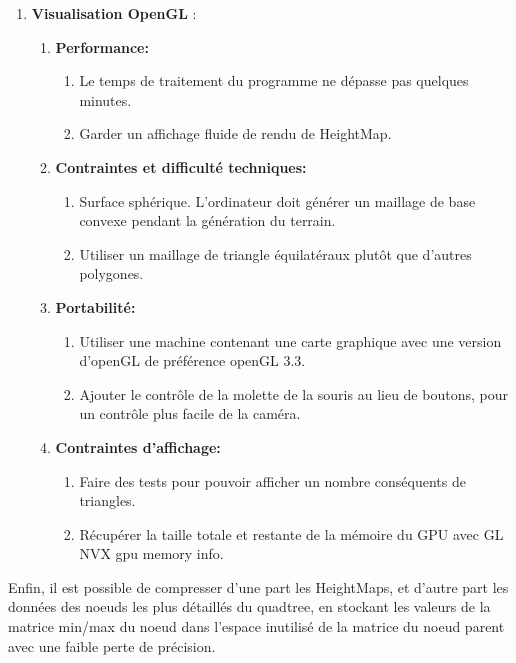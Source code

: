 \documentclass[12pt]{report}
\begin{document}
\begin{enumerate}
\begin{enumerate}
    \end{enumerate}
    \item \textbf{Visualisation OpenGL} :
    \begin{enumerate}
        \item \textbf{Performance:}
        \begin{enumerate}
            \item Le temps de traitement du programme ne dépasse pas quelques minutes.
            \item Garder un affichage fluide de rendu de HeightMap.
        \end{enumerate}
            \item \textbf{Contraintes et difficulté techniques:}
            \begin{enumerate}
                \item Surface sphérique. L'ordinateur doit générer un maillage de base convexe pendant la génération du terrain.
                \item Utiliser un maillage de triangle équilatéraux plutôt que d'autres polygones.
            \end{enumerate}
        \item \textbf{Portabilité:}
        \begin{enumerate}
            \item Utiliser une machine contenant une carte graphique avec une version d'openGL de préférence openGL 3.3.
            \item Ajouter le contrôle de la molette de la souris au lieu de boutons, pour un contrôle plus facile de la caméra.
        \end{enumerate}
        \item \textbf{Contraintes d'affichage:}
        \begin{enumerate}
            \item Faire des tests pour pouvoir afficher un nombre conséquents de triangles.
            \item Récupérer la taille totale et restante de la mémoire du GPU avec GL NVX gpu memory info.
        \end{enumerate}
    \end{enumerate}
\end{enumerate}

Enfin, il est possible de compresser d'une part les HeightMaps, et d'autre part les données des noeuds les plus détaillés du quadtree, en stockant les valeurs de la matrice min/max du noeud dans l'espace inutilisé de la matrice du noeud parent avec une faible perte de précision.
\end{document}
